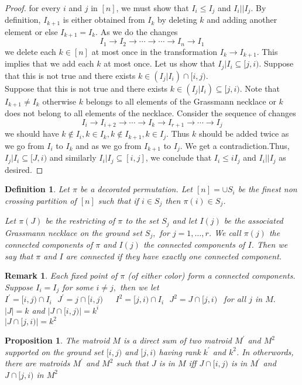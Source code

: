 \documentclass[12pt]{report}
\theoremstyle{theorem}
\newtheorem{definition}[theorem]{Definition}
\newtheorem{proposition}[theorem]{Proposition}
\newtheorem{remark}[theorem]{Remark}
\begin{document}
\begin{proof}
for every $i$ and $j$ in $[n]$, we must show that $I_i\leq I_j$ and $I_i || I_j$. By definition, $I_{k+1}$ is either obtained from $I_k$ by deleting $k$ and adding another element or else $I_{k+1} = I_k$.
As we do the changes
$$
I_1\longrightarrow I_2\longrightarrow\cdots\longrightarrow\cdots\longrightarrow I_n\longrightarrow I_1
$$
we delete each $k\in[n]$ at most once in the transformation $I_k\longrightarrow I_{k+1}.$ This implies that we add each $k$ at most once. Let us show that $I_j|I_i\subseteq [j,i)$. Suppose that this is not true and there exists $k \in (I_j|I_i)\cap[i,j)$.\\
Suppose that this is not true and there exists $k\in (I_j|I_i)\subseteq [j,i)$. Note that $I_{k+1}\neq I_k$ otherwise $k$ belongs to all elements of the Grassmann necklace or $k$ does not belong to all elements of the necklace. Consider the sequence of changes
$$
I_i\longrightarrow I_{i+2}\longrightarrow\cdots\longrightarrow I_k\longrightarrow I_{r+1}\longrightarrow \cdots\longrightarrow I_j
$$ 
we should have $k\notin I_i, k\in I_k, k\notin I_{k+1}, k\in I_j.$ Thus $k$ should be added twice as we go from $I_i$ to $I_k$ and as we go from $I_{k+1}$  to $I_j$. We get a contradiction.Thus, $I_j|I_i\subseteq [J,i)$ and similarly $I_i|I_j\subseteq [i,j]$, we conclude that $I_i\leq i I_j$ and $I_i||I_j$ as desired.
\end{proof}
\begin{definition}
\normalfont Let $\pi$ be a decorated permutation. Let $[n] = \cup S_i$ be the finest non crossing partition of $[n]$ such that if $i\in S_j$ then $\pi(i)\in S_j$.

Let $\pi(J)$ be the restricting of $\pi$ to the set $S_j$ and let $I(j)$ be the associated Grassmann necklace on the ground set $S_j,$ for $j = 1,\ldots,r$. We call $\pi(j)$ the connected components of $\pi$ and $I(j)$ the connected components of $I$. Then we say that $\pi$ and $I$ are connected if they have exactly one connected component.
\end{definition}


\begin{remark}
\normalfont Each fixed point of $\pi$ (of either color) form a connected components. Suppose $I_i = I_j$ for some $i\neq j,$ then we let $I^\prime = [i,j)\cap I_i~~~ J^\prime = j \cap [i,j)~~~~~~~ I^2 = [j,i)\cap I_i~~~ J^2 = J\cap [j,i)~~$ for all $j$ in $M.$\\
$|J| = k$ and $|J\cap [i,j)| = k^i$\\
$|J\cap [j,i)| = k^2$
\end{remark}
 \begin{proposition}
The matroid $M$ is a direct sum of two matroid $M^\prime$  and $M^2$ supported on the ground set $[i,j)$ and $[j,i)$ having rank $k^\prime$ and $k^2$. In otherwords, there are matroids $M^\prime$ and $M^2$ such that $J$ is in $M$ iff $J\cap [i,j)$ is in $M^\prime$ and $J\cap [j,i)$ in $M^2$
\end{proposition}
\end{document}
